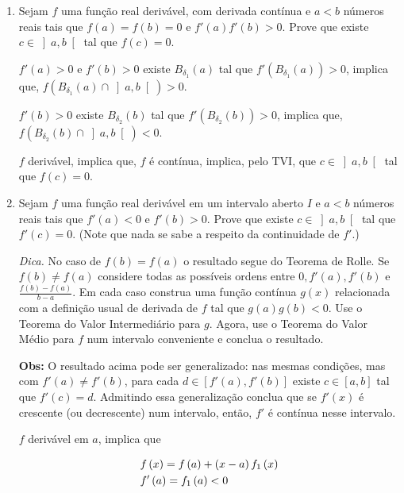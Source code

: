 \documentclass{book}
\begin{document}
\begin{enumerate}
  \item Sejam $f$ uma fun\c{c}\~ao real deriv\'avel, com derivada cont\'inua e $a<b$ n\'umeros reais tais que $f(a) = f(b) = 0$ e $f'(a) f'(b) > 0$. Prove que existe $c \in \left] {a,b} \right[$ tal que $f(c)=0$.

\begin{sol}
$f'(a)>0$ e $f'(b)>0$ existe $B_{\delta _1 }(a)$ tal que $f'\left( {B_{\delta _1 } \left( a \right)} \right) > 0$, implica que, $f\left( {B_{\delta _1 } \left( a \right) \cap \left] {a,b} \right[} \right) > 0$.

$f'(b)>0$ existe $B_{\delta _2 }(b)$ tal que $f'\left( {B_{\delta _2 } \left( b \right)} \right) > 0$, implica que, $f\left( {B_{\delta _2 } \left( b \right) \cap \left] {a,b} \right[} \right) < 0$.

$f$ deriv\'avel, implica que, $f$ \'e cont\'inua, implica, pelo TVI, que $c \in \left] {a,b} \right[$ tal que $f(c) = 0$.
\end{sol}

  \item Sejam $f$ uma fun\c{c}\~ao real deriv\'avel em um intervalo aberto $I$ e $a<b$ n\'umeros reais tais que $f'(a) < 0$ e $f'(b) > 0$. Prove que existe $c \in \left] {a,b} \right[$ tal que $f'(c)=0$. (Note que nada se sabe a respeito da continuidade de $f'$.)

      \textit{Dica.} No caso de $f(b) = f(a)$ o resultado segue do Teorema de Rolle. Se $f(b) \ne f(a)$ considere todas as poss\'iveis ordens entre $0,f'(a),f'(b)$ e $\displaystyle \frac{{f\left( b \right) - f\left( a \right)}}{{b - a}}$. Em cada caso construa uma fun\c{c}\~ao cont\'inua $g(x)$ relacionada com a defini\c{c}\~ao usual de derivada de $f$ tal que $g(a)g(b)<0$. Use o Teorema do Valor Intermedi\'ario para $g$. Agora, use o Teorema do Valor M\'edio para $f$ num intervalo conveniente e conclua o resultado.

      \textbf{Obs:} O resultado acima pode ser generalizado: nas mesmas condi\c{c}\~oes, mas com $f'(a) \ne f'(b)$, para cada $d \in \left[ {f'\left( a \right),f'\left( b \right)} \right]$ existe $c \in \left[ {a,b} \right]$ tal que $f'(c)=d$. Admitindo essa generaliza\c{c}\~ao conclua que se $f'(x)$ \'e crescente (ou decrescente) num intervalo, ent\~ao, $f'$ \'e cont\'inua nesse intervalo.

\begin{sol}
$f$ deriv\'avel em $a$, implica que

\[
\begin{gathered}
f\left( x \right) = f\left( a \right) + \left( {x - a} \right)f_1 \left( x \right) \hfill \\
f'\left( a \right) = f_1 \left( a \right) < 0 \hfill \\
\end{gathered}
\]


\end{sol}
\end{enumerate}
\end{document}
